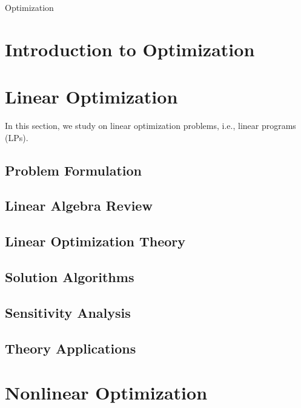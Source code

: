 \documentclass[11pt,myequations,myarticle]{article}
\def\sspace{ \renewcommand{\baselinestretch}{1.0}\small\normalsize}
\begin{document}
  \setcounter{page}{0} \sspace
\begin{center}{\LARGE Optimization} \end{center} \Large
\tableofcontents




\newpage \section{Introduction to Optimization}


\newpage \section{Linear Optimization}
In this section, we study on linear optimization problems, i.e., linear programs (LPs).

\subsection{Problem Formulation} 

\subsection{Linear Algebra Review} 

\subsection{Linear Optimization Theory} 

\subsection{Solution Algorithms}  

\subsection{Sensitivity Analysis} 

\subsection{Theory Applications} 

\newpage \section{Nonlinear Optimization}

\end{document}
